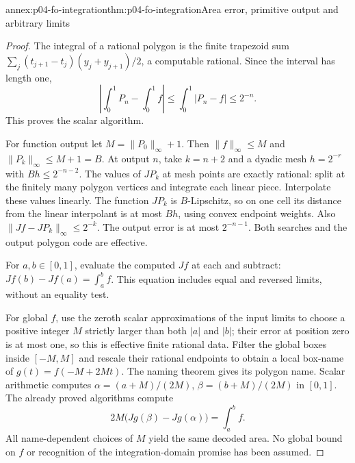 \begin{annexitem}{annex:p04-fo-integration}{thm:p04-fo-integration}{Area error, primitive output and arbitrary limits}
\begin{proof}
The integral of a rational polygon is the finite trapezoid sum
\(\sum_j(t_{j+1}-t_j)(y_j+y_{j+1})/2\), a computable rational.
Since the interval has length one,
\[
 \left|\int_0^1P_n-\int_0^1f\right|
 \leq\int_0^1|P_n-f|\leq2^{-n}.
\]
This proves the scalar algorithm.

For function output let \(M=\lVert P_0\rVert_\infty+1\).
Then \(\lVert f\rVert_\infty\leq M\) and
\(\lVert P_k\rVert_\infty\leq M+1=B\).
At output \(n\), take \(k=n+2\) and a dyadic mesh
\(h=2^{-r}\) with \(Bh\leq2^{-n-2}\).
The values of \(JP_k\) at mesh points are exactly rational:
split at the finitely many polygon vertices and integrate
each linear piece. Interpolate these values linearly.
The function \(JP_k\) is \(B\)-Lipschitz, so on one cell its
distance from the linear interpolant is at most \(Bh\),
using convex endpoint weights. Also
\(\lVert Jf-JP_k\rVert_\infty\leq2^{-k}\).
The output error is at most \(2^{-n-1}\).
Both searches and the output polygon code are effective.

For \(a,b\in[0,1]\), evaluate the computed \(Jf\) at each
and subtract: \(Jf(b)-Jf(a)=\int_a^bf\).
This equation includes equal and reversed limits, without
an equality test.

For global \(f\), use the zeroth scalar approximations of
the input limits to choose a positive integer \(M\) strictly
larger than both \(|a|\) and \(|b|\); their error at position
zero is at most one, so this is effective finite rational
data. Filter the global boxes inside \([-M,M]\) and
rescale their rational endpoints to obtain a local box-name
of \(g(t)=f(-M+2Mt)\). The naming theorem gives its polygon
name. Scalar arithmetic computes
\(\alpha=(a+M)/(2M)\), \(\beta=(b+M)/(2M)\) in \([0,1]\).
The already proved algorithms compute
\[
 2M\bigl(Jg(\beta)-Jg(\alpha)\bigr)=\int_a^bf.
\]
All name-dependent choices of \(M\) yield the same decoded
area. No global bound on \(f\) or recognition of the
integration-domain promise has been assumed.
\end{proof}
\end{annexitem}

